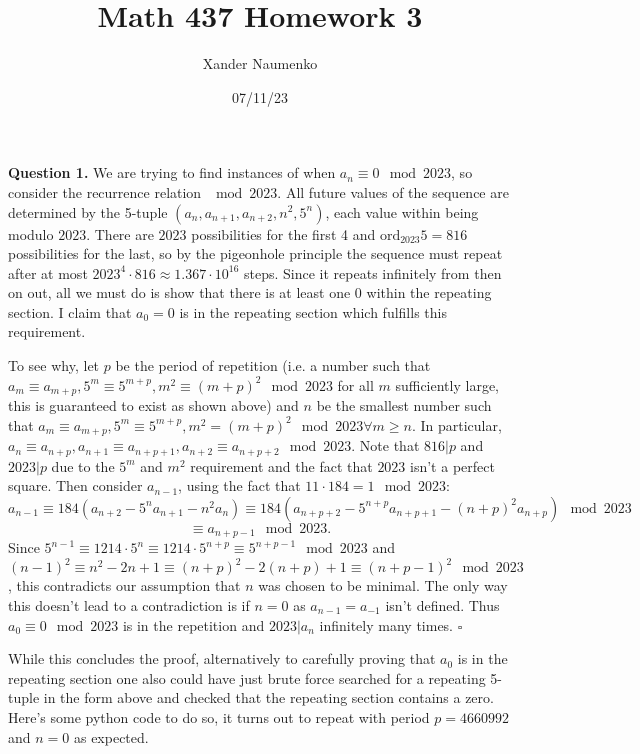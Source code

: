 \documentclass[letterpaper, reqno,11pt]{article}
\begin{document}
\title{Math 437 Homework 3}
\date{07/11/23}
\author{Xander Naumenko}
\maketitle

{\medskip\noindent\bf Question 1.} We are trying to find instances of when $a_n\equiv 0\mod 2023$, so consider the recurrence relation $\mod 2023$. All future values of the sequence are determined by the 5-tuple $(a_n,a_{n+1},a_{n+2},n^2,5^{n})$, each value within being modulo $2023$. There are $2023$ possibilities for the first 4 and $\text{ord}_{2023}5=816$ possibilities for the last, so by the pigeonhole principle the sequence must repeat after at most $2023^{4}\cdot 816\approx 1.367\cdot 10^{16}$ steps. Since it repeats infinitely from then on out, all we must do is show that there is at least one 0 within the repeating section. I claim that $a_0=0$ is in the repeating section which fulfills this requirement.

To see why, let $p$ be the period of repetition (i.e. a number such that $a_m\equiv a_{m+p}, 5^{m}\equiv 5^{m+p}, m^2\equiv (m+p)^2\mod 2023$ for all $m$ sufficiently large, this is guaranteed to exist as shown above) and $n$ be the smallest number such that $a_{m}\equiv a_{m+p},5^{m}\equiv 5^{m+p},m^2=(m+p)^2\mod 2023\forall m\geq n$. In particular, $a_{n}\equiv a_{n+p},a_{n+1}\equiv a_{n+p+1},a_{n+2}\equiv a_{n+p+2}\mod 2023$. Note that $816|p$ and $2023|p$ due to the $5^{m}$ and $m^2$ requirement and the fact that $2023$ isn't a perfect square. Then consider $a_{n-1}$, using the fact that $11\cdot 184=1\mod 2023$:
\[
a_{n-1}\equiv 184\left( a_{n+2}-5^{n}a_{n+1}-n^2a_{n} \right)\equiv 184\left( a_{n+p+2}-5^{n+p}a_{n+p+1}-(n+p)^2a_{n+p} \right) \mod 2023
\]
\[
\equiv a_{n+p-1}\mod 2023
.\]
Since $5^{n-1}\equiv 1214\cdot 5^{n}\equiv 1214\cdot 5^{n+p}\equiv 5^{n+p-1}\mod 2023$ and $(n-1)^2\equiv n^2-2n+1\equiv (n+p)^2-2(n+p)+1\equiv (n+p-1)^2\mod 2023$, this contradicts our assumption that $n$ was chosen to be minimal. The only way this doesn't lead to a contradiction is if $n=0$ as $a_{n-1}=a_{-1}$ isn't defined. Thus $a_0\equiv 0\mod 2023$ is in the repetition and $2023|a_n$ infinitely many times. $\square$

While this concludes the proof, alternatively to carefully proving that $a_0$ is in the repeating section one also could have just brute force searched for a repeating 5-tuple in the form above and checked that the repeating section contains a zero. Here's some python code to do so, it turns out to repeat with period $p=4660992$ and $n=0$ as expected.
\end{document}
